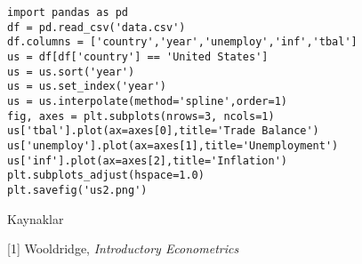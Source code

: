 \documentclass[12pt,fleqn]{article}\usepackage{../../common}
\begin{document}
\begin{verbatim}
import pandas as pd
df = pd.read_csv('data.csv')
df.columns = ['country','year','unemploy','inf','tbal']
us = df[df['country'] == 'United States']
us = us.sort('year')
us = us.set_index('year')
us = us.interpolate(method='spline',order=1)
fig, axes = plt.subplots(nrows=3, ncols=1)
us['tbal'].plot(ax=axes[0],title='Trade Balance')
us['unemploy'].plot(ax=axes[1],title='Unemployment')
us['inf'].plot(ax=axes[2],title='Inflation')
plt.subplots_adjust(hspace=1.0)
plt.savefig('us2.png')
\end{verbatim}











Kaynaklar

[1] Wooldridge, {\em Introductory Econometrics}
\end{document}
